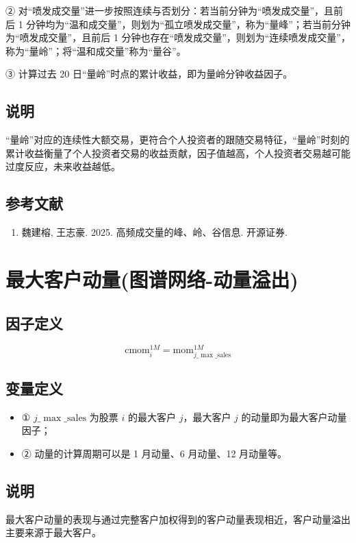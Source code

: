 \documentclass{article}
\begin{document}
② 对“喷发成交量”进一步按照连续与否划分：若当前分钟为“喷发成交量”，且前后 1 分钟均为“温和成交量”，则划为“孤立喷发成交量”，称为“量峰”；若当前分钟为“喷发成交量”，且前后 1 分钟也存在“喷发成交量”，则划为“连续喷发成交量”，称为“量岭”；将“温和成交量”称为“量谷”。

③ 计算过去 20 日“量岭”时点的累计收益，即为量岭分钟收益因子。

\subsection{说明}
“量岭”对应的连续性大额交易，更符合个人投资者的跟随交易特征，“量岭”时刻的累计收益衡量了个人投资者交易的收益贡献，因子值越高，个人投资者交易越可能过度反应，未来收益越低。

\subsection{参考文献}
\begin{enumerate}
    \item 魏建榕, 王志豪. 2025. 高频成交量的峰、岭、谷信息. 开源证券.
\end{enumerate}

\section{最大客户动量(图谱网络-动量溢出)}

\subsection{因子定义}
\begin{equation}
    \mathrm{cmom}_i^{1M} = \mathrm{mom}_{j\_{\max\_\mathrm{sales}}}^{1M}
\end{equation}

\subsection{变量定义}
\begin{itemize}
    \item ① \( j\_{\max\_\mathrm{sales}} \) 为股票 \( i \) 的最大客户 \( j \)，最大客户 \( j \) 的动量即为最大客户动量因子；
    \item ② 动量的计算周期可以是 1 月动量、6 月动量、12 月动量等。
\end{itemize}

\subsection{说明}
最大客户动量的表现与通过完整客户加权得到的客户动量表现相近，客户动量溢出主要来源于最大客户。
\end{document}
